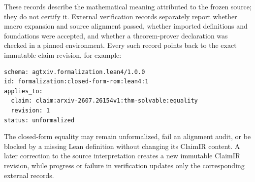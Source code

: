 These records describe the mathematical meaning attributed to the frozen source; they do not certify it. External verification records separately report whether macro expansion and source alignment passed, whether imported definitions and foundations were accepted, and whether a theorem-prover declaration was checked in a pinned environment. Every such record points back to the exact immutable claim revision, for example:
\begin{verbatim}
schema: agtxiv.formalization.lean4/1.0.0
id: formalization:closed-form-rom:lean4:1
applies_to:
  claim: claim:arxiv-2607.26154v1:thm-solvable:equality
  revision: 1
status: unformalized
\end{verbatim}
The closed-form equality may remain unformalized, fail an alignment audit, or be blocked by a missing Lean definition without changing its ClaimIR content. A later correction to the source interpretation creates a new immutable ClaimIR revision, while progress or failure in verification updates only the corresponding external records.
